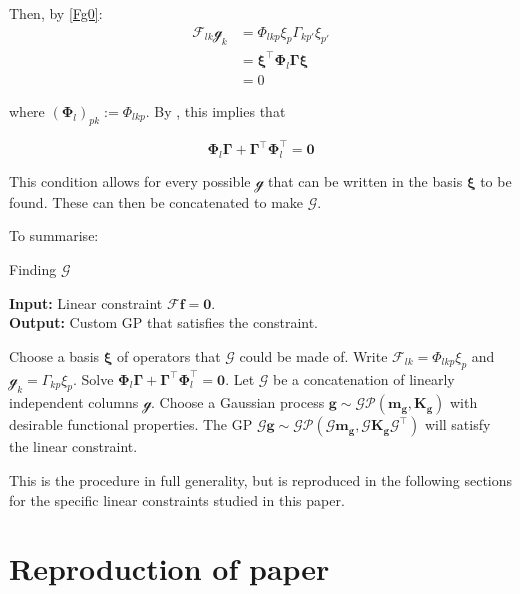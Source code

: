 \documentclass[12pt,a4paper,twoside]{report}
\theoremstyle{definition}
\begin{document}
Then, by \cref{Fg0}:
\begin{align*}
	\mathscr F_{lk}\mathscr g_k &= \Phi_{lkp}\xi_p\Gamma_{kp'}\xi_{p'}\\
	&= \boldsymbol \xi^\top \boldsymbol \Phi_l \boldsymbol \Gamma \boldsymbol \xi\\
	&= 0
\end{align*}

where $(\boldsymbol \Phi_l)_{pk}:=\Phi_{lkp}$. By , this implies that

$$\boldsymbol \Phi_l \boldsymbol \Gamma + \boldsymbol \Gamma^\top \boldsymbol \Phi_l^\top=\mathbf 0$$

This condition allows for every possible $\mathscr g$ that can be written in the basis $\boldsymbol \xi$ to be found. These can then be concatenated to make $\mathscr G$. 

To summarise:

\begin{algorithm}
\caption{Finding $\mathscr G$}\label{findingGalg}
	 \hspace*{\algorithmicindent} \textbf{Input:} Linear constraint $\mathscr F \mathbf f = \mathbf 0$. \\
	 \hspace*{\algorithmicindent} \textbf{Output:} Custom GP that satisfies the constraint. 
\begin{algorithmic}[1]
	\State Choose a basis $\boldsymbol \xi$ of operators that $\mathscr G$ could be made of.
	\State Write $\mathscr F_{lk} = \Phi_{lkp}\xi_p$ and $\mathscr g_k = \Gamma_{kp} \xi_p$.
	\State Solve $\boldsymbol \Phi_l \boldsymbol \Gamma + \boldsymbol \Gamma^\top \boldsymbol \Phi_l^\top=\mathbf 0$.
	\State Let $\mathscr G$ be a concatenation of linearly independent columns $\mathscr g$.
	\State Choose a Gaussian process $\mathbf g\sim \mathcal{GP}(\mathbf m_\mathbf g, \mathbf K_\mathbf g)$ with desirable functional properties.
	\State The GP $\mathscr G\mathbf g\sim \mathcal {GP}(\mathscr G\mathbf m_\mathbf g, \mathscr G \mathbf K_\mathbf g \mathscr G^\top)$ will satisfy the linear constraint.
\end{algorithmic}
\end{algorithm}


This is the procedure in full generality, but is reproduced in the following sections for the specific linear constraints studied in this paper.

\chapter{Reproduction of paper}
\end{document}
